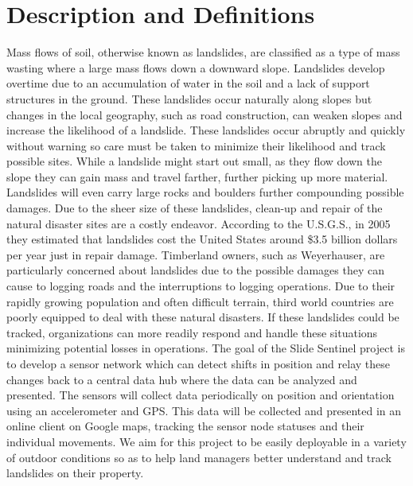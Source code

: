 \documentclass[onecolumn, draftclsnofoot,10pt, compsoc]{IEEEtran}
\begin{document}
\newpage
{}
\tableofcontents
\clearpage

\section{Description and Definitions}
Mass flows of soil, otherwise known as landslides, are classified as a type of mass wasting where a large mass flows down a downward slope. Landslides develop overtime due to an accumulation of water in the soil and a lack of support structures in the ground. These landslides occur naturally along slopes but changes in the local geography, such as road construction, can weaken slopes and increase the likelihood of a landslide.\cite{glade2003landslide} These landslides occur abruptly and quickly without warning so care must be taken to minimize their likelihood and track possible sites. While a landslide might start out small, as they flow down the slope they can gain mass and travel farther, further picking up more material. Landslides will even carry large rocks and boulders further compounding possible damages. Due to the sheer size of these landslides, clean-up and repair of the natural disaster sites are a costly endeavor. According to the U.S.G.S., in 2005 they estimated that landslides cost the United States around \$3.5 billion dollars per year just in repair damage.\cite{dangerlandslide} Timberland owners, such as Weyerhauser, are particularly concerned about landslides due to the possible damages they can cause to logging roads and the interruptions to logging operations. Due to their rapidly growing population and often difficult terrain, third world countries are poorly equipped to deal with these natural disasters.\cite{guzzetti1999landslide} If these landslides could be tracked, organizations can more readily respond and handle these situations minimizing potential losses in operations. The goal of the Slide Sentinel project is to develop a sensor network which can detect shifts in position and relay these changes back to a central data hub where the data can be analyzed and presented. The sensors will collect data periodically on position and orientation using an accelerometer and GPS. This data will be collected and presented in an online client on Google maps, tracking the sensor node statuses and their individual movements. We aim for this project to be easily deployable in a variety of outdoor conditions so as to help land managers better understand and track landslides on their property.
\end{document}
